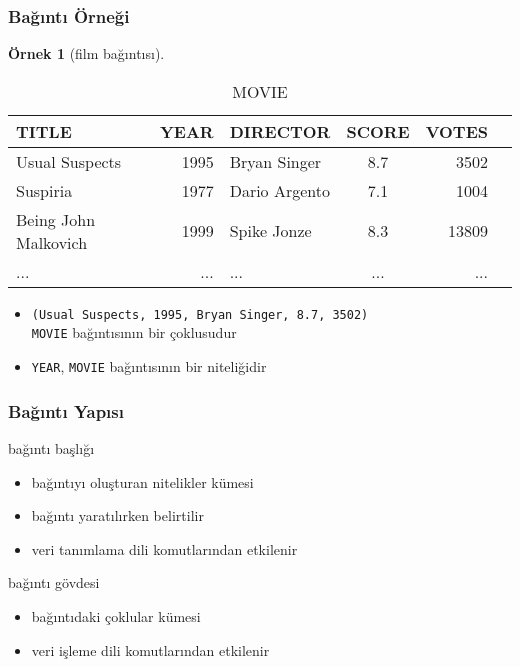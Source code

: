 \documentclass[dvipsnames]{beamer}
\theoremstyle{definition}
\theoremstyle{example}
\newtheorem{ornek}[theorem]{Örnek}
\theoremstyle{plain}
\begin{document}
\begin{frame}
  \frametitle{Bağıntı Örneği}

  \begin{ornek}[film bağıntısı]
    \begin{tiny}
    \begin{table}
      \caption{MOVIE}
      \begin{tabular}{|l|r|l|c|r|r|}\hline
TITLE                & YEAR & DIRECTOR      & SCORE & VOTES\\\hline\hline
Usual Suspects       & 1995 & Bryan Singer  &   8.7 &  3502\\\hline
Suspiria             & 1977 & Dario Argento &   7.1 &  1004\\\hline
Being John Malkovich & 1999 & Spike Jonze   &   8.3 & 13809\\\hline
...                  &  ... & ...           &   ... &   ...\\\hline
      \end{tabular}
    \end{table}
    \end{tiny}

    \pause
    \begin{itemize}
      \item \texttt{(Usual Suspects, 1995, Bryan Singer, 8.7, 3502)}\\
        \texttt{MOVIE} bağıntısının bir çoklusudur
      \item \texttt{YEAR}, \texttt{MOVIE} bağıntısının bir niteliğidir
    \end{itemize}
  \end{ornek}
\end{frame}

\begin{frame}
  \frametitle{Bağıntı Yapısı}

  \begin{block}{bağıntı başlığı}
    \begin{itemize}
      \item bağıntıyı oluşturan nitelikler kümesi
      \item bağıntı yaratılırken belirtilir
      \item veri tanımlama dili komutlarından etkilenir
    \end{itemize}
  \end{block}

  \pause
  \begin{block}{bağıntı gövdesi}
    \begin{itemize}
      \item bağıntıdaki çoklular kümesi
      \item veri işleme dili komutlarından etkilenir
    \end{itemize}
  \end{block}
\end{frame}
\end{document}
